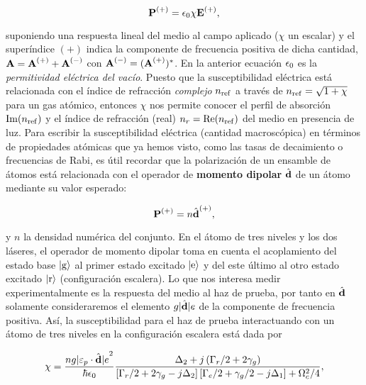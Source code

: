 \begin{equation}
\label{ec:polarizacionCampoE}
\text{\textbf{P}}^{(+)}=\epsilon_{0}\chi\text{\textbf{E}}^{(+)},
\end{equation}

suponiendo una respuesta lineal del medio al campo aplicado ($\chi$ un escalar) y el superíndice $(+)$ indica la componente de frecuencia positiva de dicha cantidad, $\text{\textbf{A}}=\text{\textbf{A}}^{(+)}+\text{\textbf{A}}^{(-)}$ con $\text{\textbf{A}}^{(-)}=(\text{\textbf{A}}^{(+)})^{*}$. En la anterior ecuación $\epsilon_{0}$ es la \emph{permitividad eléctrica del vacío}. Puesto que la susceptibilidad eléctrica está relacionada con el índice de refracción \emph{complejo} $n_{\mathrm{ref}}$ a través de $n_{\mathrm{ref}}=\sqrt{1+\chi}$ para un gas atómico, entonces $\chi$ nos permite conocer el perfil de absorción $\operatorname{Im}\hspace{-0.6mm}{(n_{\mathrm{ref}})}$ y el índice de refracción (real) $n_{r}=\operatorname{Re}\hspace{-0.6mm}{(n_{\mathrm{ref}})}$ del medio en presencia de luz. Para escribir la susceptibilidad eléctrica (cantidad macroscópica) en términos de propiedades atómicas que ya hemos visto, como las tasas de decaimiento o frecuencias de Rabi, es útil recordar que la polarización de un ensamble de átomos está relacionada con el operador de \textbf{momento dipolar} $\hat{\text{\textbf{d}}}$ de un átomo mediante su valor esperado:

\begin{equation}
\label{ec:polarizacionMomentoDipolar}
\vektor{P}^\sm{(+)}=n\braket{\hat{\vektor{d}}^\sm{(+)}},
\end{equation}

y $n$ la densidad numérica del conjunto. En el átomo de tres niveles y los dos láseres, el operador de momento dipolar toma en cuenta el acoplamiento del estado base $\ket{g}$ al primer estado excitado $\ket{e}$ y del este último al otro estado excitado $\ket{r}$ (configuración escalera). Lo que nos interesa medir experimentalmente es la respuesta del medio al haz de prueba, por tanto en $\braket{\hat{\vektor{d}}}$ solamente consideraremos el elemento $\braket{g|\hat{\vektor{d}}|e}$ de la componente de frecuencia positiva. Así, la susceptibilidad para el haz de prueba interactuando con un átomo de tres niveles en la configuración escalera está dada por

\begin{equation}
\label{ec:susceptibilidad}
\chi=\dfrac{n\braket{g|\varepsilon_\sm{p}\cdot\hat{\vektor{d}}|e}^{2}}{\hbar\epsilon_\sm{0}}\dfrac{\Delta_\sm{2}+j\left(\Gamma_\sm{r}/2+2\gamma_\sm{g}\right)}{\left[\Gamma_\sm{r}/2+2\gamma_\sm{g}-j\Delta_\sm{2}\right]\left[\Gamma_\sm{e}/2+\gamma_\sm{g}/2-j\Delta_\sm{1}\right]+\Omega^{2}_\sm{c}/4},
\end{equation}

